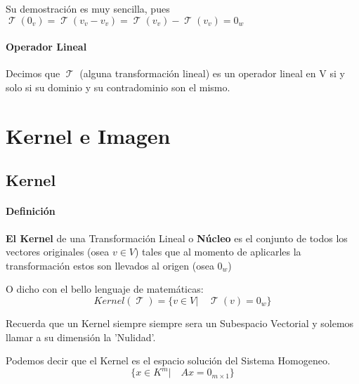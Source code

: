\documentclass[12pt]{report}                                %
\DeclareMathOperator \LinealTransformation {\mathcal{T}}
\begin{document}
            Su demostración es muy sencilla, pues
            $\LinealTransformation(0_v)=\LinealTransformation(v_v-v_v)=\LinealTransformation(v_v)-\LinealTransformation(v_v)=0_w$

        \subsubsection{Operador Lineal}
            Decimos que $\LinealTransformation$ (alguna transformación lineal) es un
            operador lineal en V si y solo si su dominio y su contradominio son el mismo.


\chapter{Kernel e Imagen}

    \clearpage
    \section{Kernel}
        \subsubsection{Definición}
        \textbf{El Kernel} de una Transformación Lineal o \textbf{Núcleo} es el conjunto 
        de todos los vectores originales (osea $v \in V$) tales que al momento de
        aplicarles la transformación estos son llevados al origen (osea $0_w$)

        O dicho con el bello lenguaje de matemáticas:
        \begin{equation}
            Kernel(\LinealTransformation) = \{v \in V |\quad \LinealTransformation(v) = 0_w\}
        \end{equation}

        Recuerda que un Kernel siempre siempre sera un Subespacio Vectorial y solemos
        llamar a su dimensión la 'Nulidad'.

        Podemos decir que el Kernel es el espacio solución del Sistema Homogeneo.
        \begin{equation*}
            \{x \in K^m |\quad Ax = 0_{m \times 1} \}
        \end{equation*}
\end{document}
